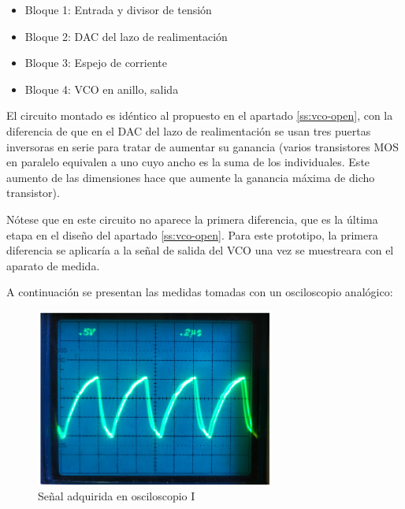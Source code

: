 \documentclass[12pt]{report} %
\begin{document}
	\begin{itemize}
		\item Bloque 1: Entrada y divisor de tensión
		\item Bloque 2: DAC del lazo de realimentación
		\item Bloque 3: Espejo de corriente
		\item Bloque 4: VCO en anillo, salida
	\end{itemize}
	
	El circuito montado es idéntico al propuesto en el apartado \ref{ss:vco-open}, con la diferencia de que en el DAC del lazo de realimentación se usan tres puertas inversoras en serie para tratar de aumentar su ganancia (varios transistores MOS en paralelo equivalen a uno cuyo ancho es la suma de los individuales. Este aumento de las dimensiones hace que aumente la ganancia máxima de dicho transistor).
	
	Nótese que en este circuito no aparece la primera diferencia, que es la última etapa en el diseño del apartado \ref{ss:vco-open}. Para este prototipo, la primera diferencia se aplicaría a la señal de salida del VCO una vez se muestreara con el aparato de medida.
	
	A continuación se presentan las medidas tomadas con un osciloscopio analógico:
	
	\begin{figure}[H]
		\includegraphics[width=0.7\textwidth]{proto-osc-clear-cropped.png}
		\caption[Señal adquirida en osciloscopio I]{Señal adquirida en osciloscopio I}
		\label{fig:proto-osc-clear-cropped.png}
	\end{figure}
	
\end{document}
